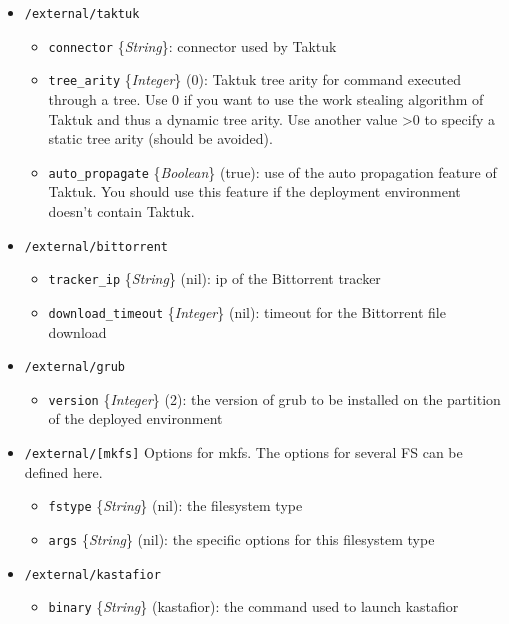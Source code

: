 \documentclass[a4wide,10pt,oneside]{book}
\newcommand{\ypath}[1]{\texttt{#1}}
\newcommand{\yfield}[2]{\texttt{#1} {\small\{{\emph{#2}}\}}:}
\newcommand{\yfieldd}[3]{\texttt{#1} {\small\{{\emph{#2}}\}} {\small(}#3{\small)}:}
\begin{document}
\begin{itemize}
  \item \ypath{/external/taktuk}
  \begin{itemize}
    \item \yfield{connector}{String} connector used by Taktuk
    \item \yfieldd{tree\_arity}{Integer}{0} Taktuk tree arity for command executed through a tree. Use 0 if you want to use the work stealing algorithm of Taktuk and thus a dynamic tree arity. Use another value >0 to specify a static tree arity (should be avoided).
    \item \yfieldd{auto\_propagate}{Boolean}{true} use of the auto propagation feature of Taktuk. You should use this feature if the deployment environment doesn't contain Taktuk.
  \end{itemize}

  \item \ypath{/external/bittorrent}
  \begin{itemize}
    \item \yfieldd{tracker\_ip}{String}{nil} ip of the Bittorrent tracker
    \item \yfieldd{download\_timeout}{Integer}{nil} timeout for the Bittorrent file download
  \end{itemize}

  \item \ypath{/external/grub}
  \begin{itemize}
    \item \yfieldd{version}{Integer}{2} the version of grub to be installed on the partition of the deployed environment
  \end{itemize}

  \item \ypath{/external/[mkfs]} Options for mkfs. The options for several FS can be defined here.
  \begin{itemize}
    \item \yfieldd{fstype}{String}{nil} the filesystem type
    \item \yfieldd{args}{String}{nil} the specific options for this filesystem type
  \end{itemize}

  \item \ypath{/external/kastafior}
  \begin{itemize}
    \item \yfieldd{binary}{String}{kastafior} the command used to launch kastafior
  \end{itemize}
\end{itemize}
\end{document}
